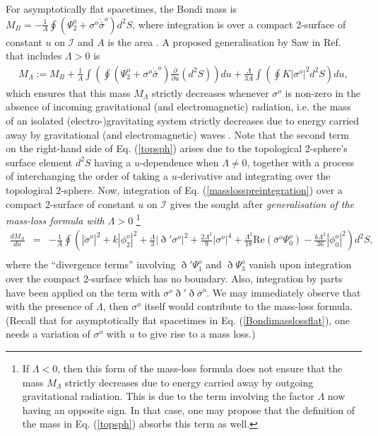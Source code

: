 \documentclass[aps,pre,preprint,superscriptaddress,showpacs,showkeys]{revtex4-1}
\begin{document}
For asymptotically flat spacetimes, the Bondi mass is $\displaystyle M_B=-\frac{1}{A}\oint{(\Psi^o_2+\sigma^o\dot{\bar{\sigma}}^o)}d^2S$, where integration is over a compact 2-surface of constant $u$ on $\mathcal{I}$ and $A$ is the area \cite{newunti62}. A proposed generalisation by Saw in Ref. \cite{Vee2016} that includes $\Lambda>0$ is
\begin{eqnarray}\label{topsph}
M_{\Lambda}:=M_B+\frac{1}{A}\int{\left(\oint{\left(\Psi^o_2+\sigma^o\dot{\bar{\sigma}}^o\right)\frac{\partial}{\partial u}(d^2S)}\right)du}+\frac{\Lambda}{3A}\int{\left(\oint{K|\sigma^o|^2d^2S}\right)du},
\end{eqnarray}
which ensures that this mass $M_\Lambda$ strictly decreases whenever $\sigma^o$ is non-zero in the absence of incoming gravitational (and electromagnetic) radiation, i.e. the mass of an isolated (electro-)gravitating system strictly decreases due to energy carried away by gravitational (and electromagnetic) waves \cite{Vee2016,Vee2017}. Note that the second term on the right-hand side of Eq. (\ref{topsph}) arises due to the topological 2-sphere's surface element $d^2S$ having a $u$-dependence when $\Lambda\neq0$, together with a process of interchanging the order of taking a $u$-derivative and integrating over the topological 2-sphere. Now, integration of Eq. (\ref{masslosspreintegration}) over a compact 2-surface of constant $u$ on $\mathcal{I}$ gives the sought after \emph{generalisation of the mass-loss formula with $\Lambda>0$} \footnote{If $\Lambda<0$, then this form of the mass-loss formula does not ensure that the mass $M_\Lambda$ strictly decreases due to energy carried away by outgoing gravitational radiation. This is due to the term involving the factor $\Lambda$ now having an opposite sign. In that case, one may propose that the definition of the mass in Eq. (\ref{topsph}) absorbs this term as well.}
\begin{eqnarray}
\frac{dM_{\Lambda}}{du}
&=&-\frac{1}{A}\oint{\left(|\dot{\sigma}^o|^2+k|\phi^o_2|^2+\frac{\Lambda}{3}|\eth'\sigma^o|^2+\frac{2\Lambda^2}{9}|\sigma^o|^4+\frac{\Lambda^2}{18}\textrm{Re}(\bar{\sigma}^o\Psi^o_0)-\frac{k\Lambda^2}{36}|\phi^o_0|^2\right)d^2S},\nonumber\\\label{0Bondimasslosspsi0ST}
\end{eqnarray}
where the ``divergence terms'' involving $\eth'\Psi^o_1$ and $\eth\Psi^o_3$ vanish upon integration over the compact 2-surface which has no boundary. Also, integration by parts have been applied on the term with $\sigma^o\eth'\eth\bar{\sigma}^o$. We may immediately observe that with the presence of $\Lambda$, then $\sigma^o$ itself would contribute to the mass-loss formula. (Recall that for asymptotically flat spacetimes in Eq. (\ref{Bondimasslossflat}), one needs a variation of $\sigma^o$ with $u$ to give rise to a mass loss.)
\end{document}
